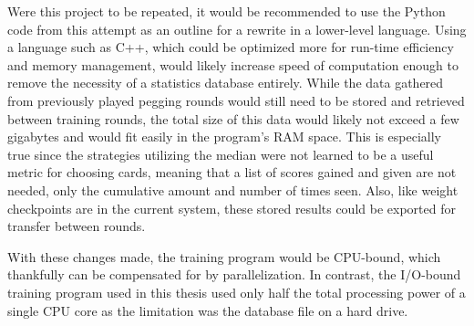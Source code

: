 Were this project to be repeated,
it would be recommended to use the Python code from this attempt as an outline
for a rewrite in a lower-level language.
%
Using a language such as C++,
which could be optimized more for run-time efficiency and memory management,
would likely increase speed of computation enough to remove the necessity
of a statistics database entirely.
%
While the data gathered from previously played pegging rounds would still need
to be stored and retrieved between training rounds,
the total size of this data would likely not exceed a few gigabytes and would fit
easily in the program's RAM space.
%
This is especially true since the strategies utilizing the median were not
learned to be a useful metric for choosing cards,
meaning that a list of scores gained and given are not needed,
only the cumulative amount and number of times seen.
%
Also,
like weight checkpoints are in the current system,
these stored results could be exported
for transfer between rounds.

With these changes made,
the training program would be CPU-bound,
which thankfully can be compensated for by parallelization.
%
In contrast,
the I/O-bound training program used in this thesis used only half the total
processing power of a single CPU core
as the limitation was the database file on a hard drive.

